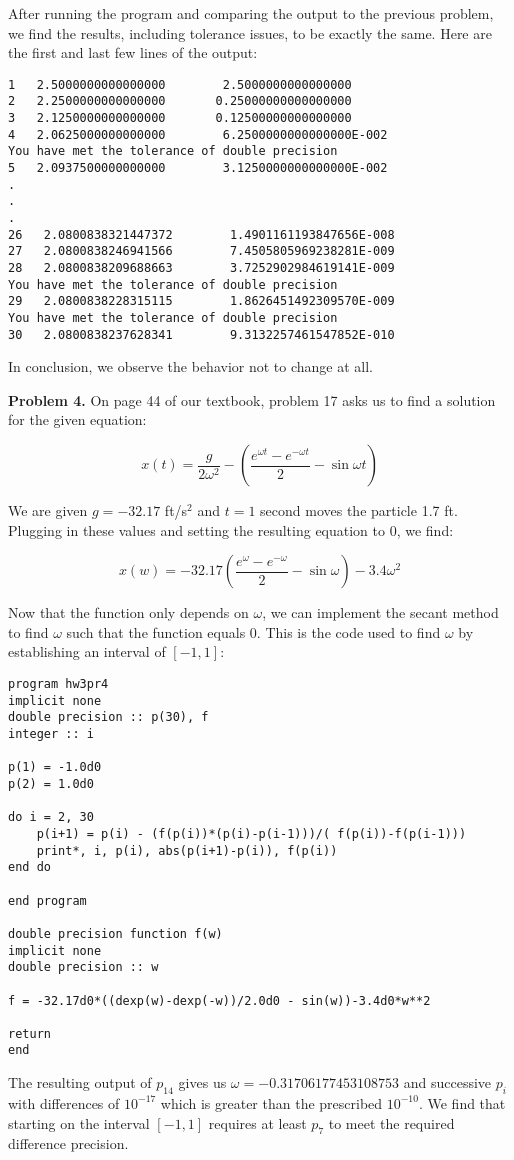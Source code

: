 \documentclass[12pt]{article}
\begin{document}
After running the program and comparing the output to the previous problem, we find the results, including tolerance issues, to be exactly the same. Here are the first and last few lines of the output:

\begin{verbatim}
1   2.5000000000000000        2.5000000000000000
2   2.2500000000000000       0.25000000000000000
3   2.1250000000000000       0.12500000000000000
4   2.0625000000000000        6.2500000000000000E-002
You have met the tolerance of double precision
5   2.0937500000000000        3.1250000000000000E-002
.
.
.
26   2.0800838321447372        1.4901161193847656E-008
27   2.0800838246941566        7.4505805969238281E-009
28   2.0800838209688663        3.7252902984619141E-009
You have met the tolerance of double precision
29   2.0800838228315115        1.8626451492309570E-009
You have met the tolerance of double precision
30   2.0800838237628341        9.3132257461547852E-010
\end{verbatim}

In conclusion, we observe the behavior not to change at all.

\bigskip

\textbf{Problem 4.} On page 44 of our textbook, problem 17 asks us to find a solution for the given equation:

\begin{equation*}
x(t)=\frac{g}{2\omega^2}-\left(\frac{e^{\omega t}-e^{-\omega t}}{2}-\sin\omega t\right)
\end{equation*}

We are given $g=-32.17$ ft/s$^2$ and $t=1$ second moves the particle 1.7 ft. Plugging in these values and setting the resulting equation to 0, we find:

\begin{equation*}
x(w)=-32.17\left(\frac{e^{\omega}-e^{-\omega}}{2}-\sin\omega\right)-3.4\omega^2
\end{equation*}

Now that the function only depends on $\omega$, we can implement the secant method to find $\omega$ such that the function equals 0. This is the code used to find $\omega$ by establishing an interval of $[-1,1]$:

\begin{verbatim}
program hw3pr4
implicit none
double precision :: p(30), f
integer :: i 

p(1) = -1.0d0
p(2) = 1.0d0

do i = 2, 30
	p(i+1) = p(i) - (f(p(i))*(p(i)-p(i-1)))/( f(p(i))-f(p(i-1)))
	print*, i, p(i), abs(p(i+1)-p(i)), f(p(i))
end do 

end program

double precision function f(w)
implicit none
double precision :: w

f = -32.17d0*((dexp(w)-dexp(-w))/2.0d0 - sin(w))-3.4d0*w**2

return
end
\end{verbatim}

The resulting output of $p_{14}$ gives us $\omega=-0.31706177453108753$ and successive $p_{i}$ with differences of $10^{-17}$ which is greater than the prescribed $10^{-10}$. We find that starting on the interval $[-1,1]$ requires at least $p_{7}$ to meet the required difference precision. 
\end{document}
